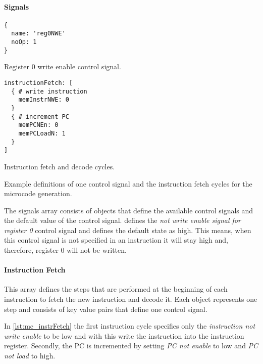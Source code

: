 \paragraph{Signals}
\begin{listing}[t]
\begin{sublisting}[b]{.5\textwidth}
  \begin{verbatim}
{
  name: 'reg0NWE'
  noOp: 1
}
  \end{verbatim}
  \caption{Register 0 write enable control signal.}
  \label{lst:mc_signals}
\end{sublisting}
\begin{sublisting}[b]{.45\textwidth}
  \begin{verbatim}
instructionFetch: [
  { # write instruction
    memInstrNWE: 0
  }
  { # increment PC
    memPCNEn: 0
    memPCLoadN: 1
  }
]
  \end{verbatim}
  \caption{Instruction fetch and decode cycles.}
  \label{lst:mc_instrFetch}
\end{sublisting}
\caption{Example definitions of one control signal and the instruction fetch cycles for the microcode generation.}
\end{listing}
The signals array consists of objects that define the available control signals and the default value of the control signal.
 defines the \emph{not write enable signal for register 0} control signal and defines the default state as high.
This means, when this control signal is not specified in an instruction it will stay high and, therefore, register 0 will not be written.

\paragraph{Instruction Fetch} This array defines the steps that are performed at the beginning of each instruction to fetch the new instruction and decode it.
Each object represents one step and consists of key value pairs that define one control signal.

In \cref{lst:mc_instrFetch} the first instruction cycle specifies only the \emph{instruction not write enable} to be low and with this write the instruction into the instruction register.
Secondly, the \gls{PC} is incremented by setting \emph{PC not enable} to low and \emph{PC not load} to high.
